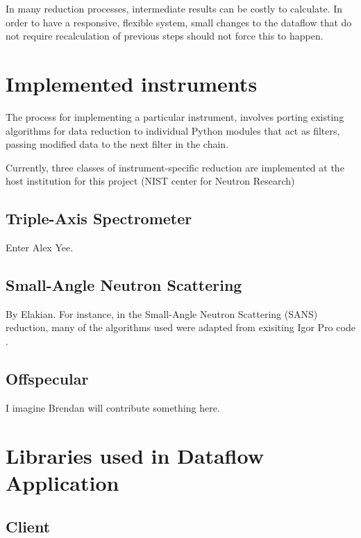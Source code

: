 \documentclass[pdf]{iucr}           %
\begin{document}
In many reduction processes, intermediate results can be costly to calculate.  In order to
have a responsive, flexible system, small changes to the dataflow that do not require recalculation
of previous steps should not force this to happen.


\section{Implemented instruments}

The process for implementing a particular instrument, involves porting existing algorithms for data reduction 
to individual Python modules that act as filters, passing modified data to the next filter in the chain.  

Currently, three classes of instrument-specific reduction are implemented at the host institution for this 
project (NIST center for Neutron Research)

\subsection{Triple-Axis Spectrometer}

Enter Alex Yee.

\subsection{Small-Angle Neutron Scattering}

By Elakian.
For instance, in the Small-Angle Neutron Scattering (SANS) reduction, many of the algorithms used were 
adapted from exisiting Igor Pro code \cite{Kline:do5025}.

\subsection{Offspecular}

I imagine Brendan will contribute something here.




\appendix
\section{Libraries used in Dataflow Application}
 
\subsection{Client}
\end{document}
